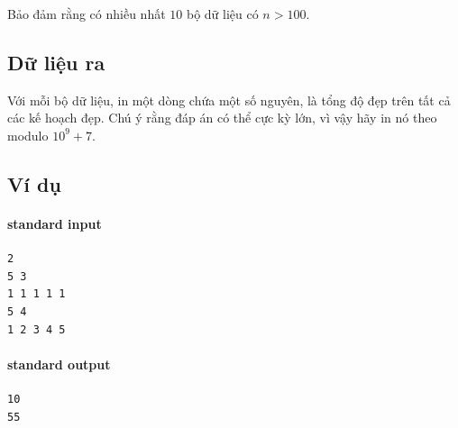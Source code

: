 \documentclass[11pt]{article}
\begin{document}
Bảo đảm rằng có nhiều nhất \(10\) bộ dữ liệu có \(n>100\).

\subsection*{Dữ liệu ra}

Với mỗi bộ dữ liệu, in một dòng chứa một số nguyên, là tổng độ đẹp trên tất
cả các kế hoạch đẹp. Chú ý rằng đáp án có thể cực kỳ lớn, vì vậy hãy in nó
theo modulo \(10^9+7\).

\subsection*{Ví dụ}

\paragraph{standard input}
\begin{verbatim}
2
5 3
1 1 1 1 1
5 4
1 2 3 4 5
\end{verbatim}

\paragraph{standard output}
\begin{verbatim}
10
55
\end{verbatim}
\end{document}
